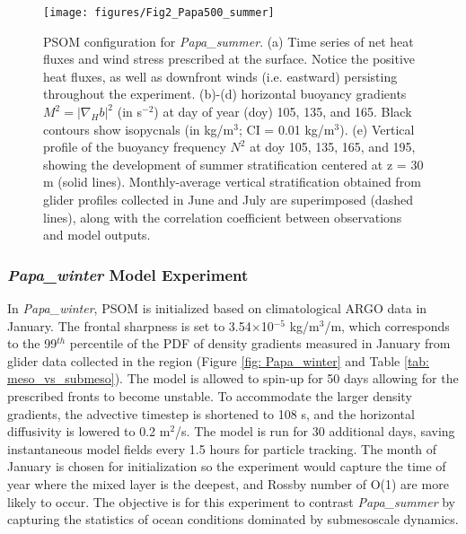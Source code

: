 \documentclass[draft,linenumbers]{agujournal2018}
\begin{document}
\begin{figure}[ht]
	\texttt{[image: figures/Fig2\_Papa500\_summer]}
	\caption{PSOM configuration for \textit{Papa\_summer}. (a) Time series of net heat fluxes and wind stress prescribed at the surface. Notice the positive heat fluxes, as well as downfront winds (i.e. eastward) persisting throughout the experiment. (b)-(d) horizontal buoyancy gradients $M^2 = |\nabla_Hb|^2$ (in s$^{-2}$) at day of year (doy) 105, 135, and 165. Black contours show isopycnals (in kg/m$^3$; CI = 0.01 kg/m$^3$). (e) Vertical profile of the buoyancy frequency $N^2$ at doy 105, 135, 165, and 195, showing the development of summer stratification centered at z = 30 m (solid lines). Monthly-average vertical stratification obtained from glider profiles collected in June and July are superimposed (dashed lines), along with the correlation coefficient between observations and model outputs.}
	\label{fig: Papa_summer}
\end{figure} 


\subsubsection{\textit{Papa\_winter} Model Experiment}

In \textit{Papa\_winter}, PSOM is initialized based on climatological ARGO data in January. The frontal sharpness is set to 3.54$\times$10$^{-5}$ kg/m$^3$/m, which corresponds to the 99$^{th}$ percentile of the PDF of density gradients measured in January from glider data collected in the region (Figure \ref{fig: Papa_winter} and Table \ref{tab: meso_vs_submeso}). The model is allowed to spin-up for 50 days allowing for the prescribed fronts to become unstable. To accommodate the larger density gradients, the advective timestep is shortened to 108 s, and the horizontal diffusivity is lowered to 0.2 m$^2$/s. The model is run for 30 additional days, saving instantaneous model fields every 1.5 hours for particle tracking. The month of January is chosen for initialization so the experiment would capture the time of year where the mixed layer is the deepest, and Rossby number of O(1) are more likely to occur. The objective is for this experiment to contrast \textit{Papa\_summer} by capturing the statistics of ocean conditions dominated by submesoscale dynamics.
\end{document}
